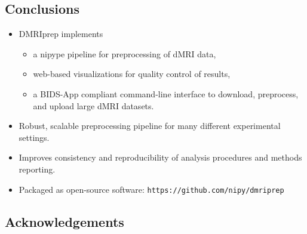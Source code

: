 \documentclass[a0, landscape]{a0poster}
\begin{document}
\begin{multicols}{3}
\color{SaddleBrown} %

\section*{Conclusions}

\begin{itemize}
    \item DMRIprep implements
    \begin{itemize}
        \item a nipype pipeline for preprocessing of dMRI data,
        \item web-based visualizations for quality control of results,
        \item a BIDS-App compliant command-line interface to download, preprocess, and upload large dMRI datasets.
    \end{itemize}

    \item Robust, scalable preprocessing pipeline for many different experimental settings.
    \item Improves consistency and reproducibility of analysis procedures and methods reporting.
    \item Packaged as open-source software: \texttt{https://github.com/nipy/dmriprep}
\end{itemize}

\color{DarkSlateGray} %


\nocite{*} %
\footnotesize  %

\subsection*{Acknowledgements} \footnotesize


\end{multicols}
\end{document}
